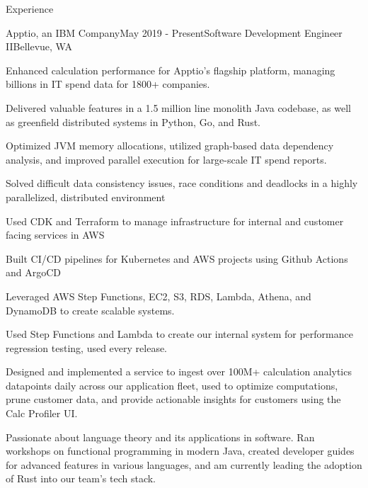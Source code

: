 \documentclass[
	11pt, %
]{resume} %
\begin{document}
\begin{rSection}{Experience}

   \begin{rSubsection}{Apptio, an IBM Company}{May 2019 - Present}{Software Development Engineer II}{Bellevue, WA}
        \item Enhanced calculation performance for Apptio's flagship platform, managing billions in IT spend data for 1800+ companies.
        \item Delivered valuable features in a 1.5 million line monolith Java codebase, as well as greenfield distributed systems in Python, Go, and Rust.
        \item Optimized JVM memory allocations, utilized graph-based data dependency analysis, and improved parallel execution for large-scale IT spend reports.
        \item Solved difficult data consistency issues, race conditions and deadlocks in a highly parallelized, distributed environment
        \item Used CDK and Terraform to manage infrastructure for internal and customer facing services in AWS
        \item Built CI/CD pipelines for Kubernetes and AWS projects using Github Actions and ArgoCD
        \item Leveraged AWS Step Functions, EC2, S3, RDS, Lambda, Athena, and DynamoDB to create scalable systems.
        \item Used Step Functions and Lambda to create our internal system for performance regression testing, used every release.
        \item Designed and implemented a service to ingest over 100M+ calculation analytics datapoints daily across
            our application fleet, used to optimize computations, prune customer data, and provide actionable insights for customers using the Calc Profiler UI.
        \item Passionate about language theory and its applications in software. Ran workshops on functional
            programming in modern Java, created developer guides for advanced features in various languages, 
            and am currently leading the adoption of Rust into our team's tech stack.
   \end{rSubsection}


\end{rSection}
\end{document}
